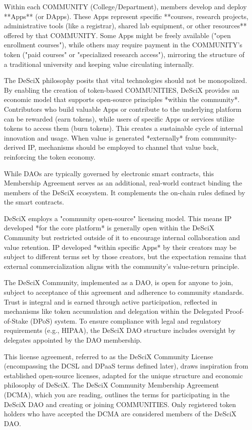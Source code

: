 \documentclass{article}
\begin{document}
Within each COMMUNITY (College/Department), members develop and deploy **Apps** (or DApps). These Apps represent specific **courses, research projects, administrative tools (like a registrar), shared lab equipment, or other resources** offered by that COMMUNITY. Some Apps might be freely available ("open enrollment courses"), while others may require payment in the COMMUNITY's token ("paid courses" or "specialized research access"), mirroring the structure of a traditional university and keeping value circulating internally.

The DeSciX philosophy posits that vital technologies should not be monopolized. By enabling the creation of token-based COMMUNITIES, DeSciX provides an economic model that supports open-source principles *within the community*. Contributors who build valuable Apps or contribute to the underlying platform can be rewarded (earn tokens), while users of specific Apps or services utilize tokens to access them (burn tokens). This creates a sustainable cycle of internal innovation and usage. When value is generated *externally* from community-derived IP, mechanisms should be employed to channel that value back, reinforcing the token economy.

While DAOs are typically governed by electronic smart contracts, this Membership Agreement serves as an additional, real-world contract binding the members of the DeSciX ecosystem. It complements the on-chain rules defined by the smart contracts.

DeSciX employs a "community open-source" licensing model. This means IP developed *for the core platform* is generally open within the DeSciX Community but restricted outside of it to encourage internal collaboration and value retention. IP developed *within specific Apps* by their creators may be subject to different terms set by those creators, but the expectation remains that external commercialization aligns with the community's value-return principle.

The DeSciX Community, implemented as a DAO, is open for anyone to join, subject to acceptance of this agreement and adherence to community standards. Trust is integral and is earned through active participation, reflected in mechanisms like token accumulation and delegation within the Delegated Proof-of-Stake (DPoS) system. To ensure compliance with legal and regulatory requirements (e.g., HIPAA), the DeSciX DAO structure includes oversight by delegates appointed by the DAO membership.

This license agreement, referred to as the DeSciX Community License (encompassing the DCSL and DPaaS terms defined later), draws inspiration from established open-source licenses, adapted for the unique structure and economic philosophy of DeSciX. The DeSciX Community Membership Agreement (DCMA), which you are reading, outlines the terms for participating in the DeSciX DAO and creating or joining COMMUNITIES. Only registered token holders who have accepted the DCMA are considered members of the DeSciX DAO.
\end{document}
